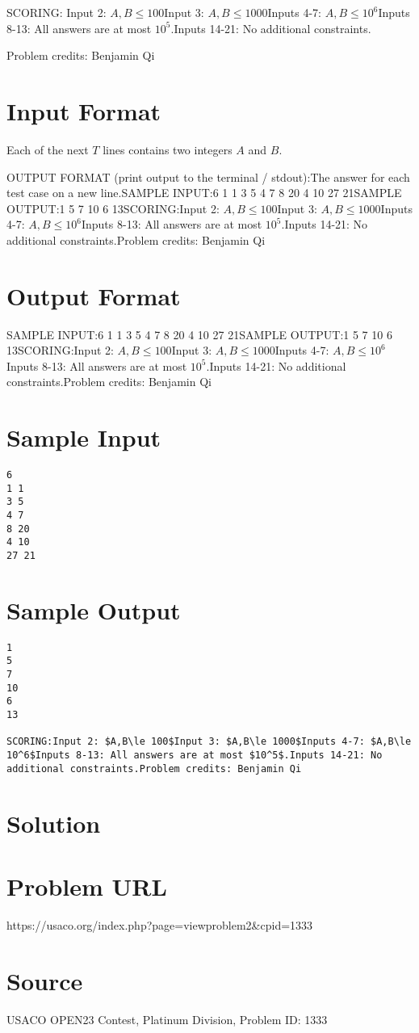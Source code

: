 \documentclass[12pt]{article}
\begin{document}
SCORING:
Input 2: $A,B\le 100$Input 3: $A,B\le 1000$Inputs 4-7: $A,B\le 10^6$Inputs 8-13: All answers are at most $10^5$.Inputs 14-21: No additional constraints.


Problem credits: Benjamin Qi



\section*{Input Format}
Each of the next $T$ lines contains two integers $A$ and $B$.

OUTPUT FORMAT (print output to the terminal / stdout):The answer for each test case on a new line.SAMPLE INPUT:6
1 1
3 5
4 7
8 20
4 10
27 21SAMPLE OUTPUT:1
5
7
10
6
13SCORING:Input 2: $A,B\le 100$Input 3: $A,B\le 1000$Inputs 4-7: $A,B\le 10^6$Inputs 8-13: All answers are at most $10^5$.Inputs 14-21: No additional constraints.Problem credits: Benjamin Qi

\section*{Output Format}
SAMPLE INPUT:6
1 1
3 5
4 7
8 20
4 10
27 21SAMPLE OUTPUT:1
5
7
10
6
13SCORING:Input 2: $A,B\le 100$Input 3: $A,B\le 1000$Inputs 4-7: $A,B\le 10^6$Inputs 8-13: All answers are at most $10^5$.Inputs 14-21: No additional constraints.Problem credits: Benjamin Qi

\section*{Sample Input}
\begin{verbatim}
6
1 1
3 5
4 7
8 20
4 10
27 21
\end{verbatim}

\section*{Sample Output}
\begin{verbatim}
1
5
7
10
6
13

SCORING:Input 2: $A,B\le 100$Input 3: $A,B\le 1000$Inputs 4-7: $A,B\le 10^6$Inputs 8-13: All answers are at most $10^5$.Inputs 14-21: No additional constraints.Problem credits: Benjamin Qi
\end{verbatim}

\section*{Solution}


\section*{Problem URL}
https://usaco.org/index.php?page=viewproblem2&cpid=1333

\section*{Source}
USACO OPEN23 Contest, Platinum Division, Problem ID: 1333
\end{document}
